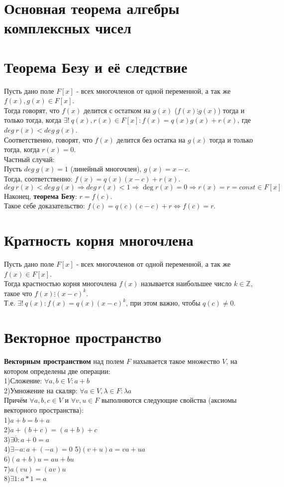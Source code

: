 \documentclass[a4paper,11pt]{report}
\begin{document}
\section{Основная теорема алгебры комплексных чисел}
\section{Теорема Безу и её следствие}
Пусть дано поле $F[x]$ - всех многочленов от одной переменной, а так же $f(x), g(x) \in F[x]$.\\
Тогда говорят, что $f(x)$ делится с остатком на $g(x)$ ($f(x)\vdots{g(x)}$) тогда и только тогда, когда 
$\exists !\ q(x), r(x) \in F[x] : f(x) = q(x)g(x) + r(x)$, где $deg\ r(x) < deg\ g(x)$.\\
Соответственно, говорят, что $f(x)$ делится без остатка на $g(x)$ тогда и только тогда, когда $r(x) = 0$.\\
Частный случай:\\
Пусть $deg\ g(x) = 1$ (линейный многочлен), $g(x) = x - c$.\\
Тогда, соответственно: $f(x) = q(x)(x - c) + r(x)$.\\
$deg\ r(x) < deg\ g(x) \Rightarrow deg\ r(x) < 1 \Rightarrow \deg r(x) = 0 \Rightarrow r(x) = r = const \in F[x]$\\
Наконец, \textbf{теорема Безу}: $r = f(c)$.\\
Такое себе доказательство: $f(c) = q(c)(c - c) + r \Leftrightarrow f(c) = r$.\\
\section{Кратность корня многочлена}
Пусть дано поле $F[x]$ - всех многочленов от одной переменной, а так же $f(x) \in F[x]$.\\
Тогда крастностью корня многочлена $f(x)$ называется наибольшее число $k \in \mathbb{Z}$, такое что
$f(x)\vdots{(x - c)^k}$.\\
Т.е. $\exists ! \ q(x): f(x) = q(x)(x - c)^k$, при этом важно, чтобы $q(c) \neq 0$.\\
\section{Векторное пространство}
\textbf{Векторным пространством} над полем $F$ нахывается такое множество $V$, на котором определены две операции:\\
1)Сложение: $\forall a, b \in V: a + b$\\
2)Умножение на скаляр: $\forall a \in V, \lambda \in F: \lambda{a} $\\
Причём $\forall a, b, c \in V$ и $\forall v, u \in F$ выполняются следующие свойства (аксиомы векторного пространства):\\
1)$a + b = b+ a$\\
2)$a + (b +c) = (a + b) + c $\\
3)$\exists \overline{0}: a + 0 = a$\\
4)$\exists -a: a + (-a) = 0$
5)$(v + u)a = va + ua$\\
6)$(a + b)u = au + bu$\\
7)$a(vu) = (av)u$\\
8)$\exists 1: a * 1 = a $\\
\end{document}
